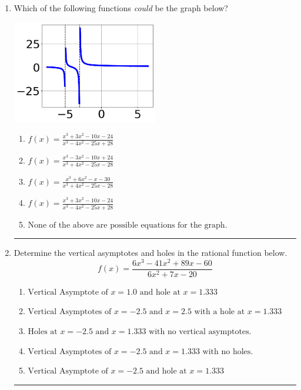 \documentclass[14pt]{extbook}
\newcommand{\litem}[1]{\item#1\hspace*{-1cm}\rule{\textwidth}{0.4pt}}
\begin{document}
\begin{enumerate}
{\begin{enumerate}[label=\Alph*.]
\end{enumerate} }
\litem{
Which of the following functions \textit{could} be the graph below?
\begin{center}
    \includegraphics[width=0.5\textwidth]{../Figures/identifyGraphOfRationalFunctionCopyB.png}
\end{center}
\begin{enumerate}[label=\Alph*.]
\item \( f(x)=\frac{x^{3} +3 x^{2} -10 x -24}{x^{3} -4 x^{2} -25 x + 28} \)
\item \( f(x)=\frac{x^{3} -3 x^{2} -10 x + 24}{x^{3} +4 x^{2} -25 x -28} \)
\item \( f(x)=\frac{x^{3} +6 x^{2} -x -30}{x^{3} +4 x^{2} -25 x -28} \)
\item \( f(x)=\frac{x^{3} +3 x^{2} -10 x -24}{x^{3} -4 x^{2} -25 x + 28} \)
\item \( \text{None of the above are possible equations for the graph.} \)

\end{enumerate} }
\litem{
Determine the vertical asymptotes and holes in the rational function below.\[ f(x) = \frac{6x^{3} -41 x^{2} +89 x -60}{6x^{2} +7 x -20} \]\begin{enumerate}[label=\Alph*.]
\item \( \text{Vertical Asymptote of } x = 1.0 \text{ and hole at } x = 1.333 \)
\item \( \text{Vertical Asymptotes of } x = -2.5 \text{ and } x = 2.5 \text{ with a hole at } x = 1.333 \)
\item \( \text{Holes at } x = -2.5 \text{ and } x = 1.333 \text{ with no vertical asymptotes.} \)
\item \( \text{Vertical Asymptotes of } x = -2.5 \text{ and } x = 1.333 \text{ with no holes.} \)
\item \( \text{Vertical Asymptote of } x = -2.5 \text{ and hole at } x = 1.333 \)

\end{enumerate} }
\end{enumerate}
\end{document}
